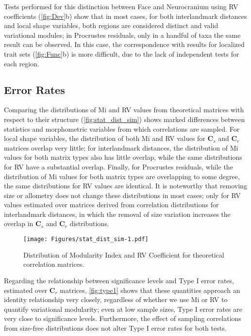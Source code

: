\documentclass[12pt,]{article}
\begin{document}
Tests performed for this distinction between Face and Neurocranium using
RV coefficients (\autoref{fig:Dev}b) show that in most cases, for both
interlandmark distances and local shape variables, both regions are
considered distinct and valid variational modules; in Procrustes
residuals, only in a handful of taxa the same result can be observed. In
this case, the correspondence with results for localized trait sets
(\autoref{fig:Func}b) is more difficult, due to the lack of independent
tests for each region.

\subsection{Error Rates}\label{error-rates}

Comparing the distributions of Mi and RV values from theoretical
matrices with respect to their structure (\autoref{fig:stat_dist_sim})
shows marked differences between statistics and morphometric variables
from which correlations are sampled. For local shape variables, the
distribution of both Mi and RV values for $\mathbf{C}_s$ and
$\mathbf{C}_r$ matrices overlap very little; for interlandmark
distances, the distribution of Mi values for both matrix types also has
little overlap, while the same distributions for RV have a substantial
overlap. Finally, for Procrustes residuals, while the distribution of Mi
values for both matrix types are overlapping to some degree, the same
distributions for RV values are identical. It is noteworthy that
removing size or allometry does not change these distributions in most
cases; only for RV values estimated over matrices derived from
correlation distributions for interlandmark distances, in which the
removal of size variation increases the overlap in $\mathbf{C}_s$ and
$\mathbf{C}_r$ distributions.

\begin{figure}[htbp]
\centering
\texttt{[image: Figures/stat\_dist\_sim-1.pdf]}
\caption{Distribution of Modularity Index and RV Coefficient for
theoretical correlation matrices. \label{fig:stat_dist_sim}}
\end{figure}

Regarding the relationship between significance levels and Type I error
rates, estimated over $\mathbf{C}_r$ matrices, \autoref{fig:type1} shows
that these quantities approach an identity relationship very closely,
regardless of whether we use Mi or RV to quantify variational
modularity; even at low sample sizes, Type I error rates are very close
to significance levels. Furthermore, the effect of sampling correlations
from size-free distributions does not alter Type I error rates for both
tests.
\end{document}
